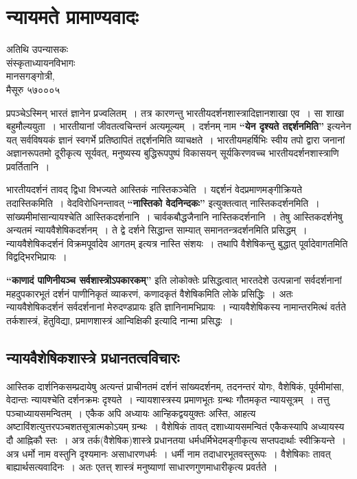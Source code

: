 {\fontsize{15}{17}\selectfont
\chapter{न्यायमते प्रामाण्यवादः}

\begin{center}
\smallskip
अतिथि उपन्यासकः\\
संस्कृताध्यायनविभागः\\
मानसगङ्गोत्री,\\ 
मैसूरु ५७०००५
\addrule
\end{center}
प्रपञ्चेऽस्मिन् भारतं ज्ञानेन प्रज्वलितम्~। तत्र कारणन्तु भारतीयदर्शनशास्त्रादिज्ञानशाखा एव~। सा शाखा बहुमौल्ययुता~। भारतीयानां जीवतत्वचिन्तनं अत्यमूल्यम्~। दर्शनम् नाम \textbf{“येन दृश्यते तद्दर्शनमिति”} इत्यनेन यत् सर्वविषयकं ज्ञानं स्वगर्भे प्रतिष्ठापितं तद्दर्शनमिति व्याचक्षते~। भारतीयमहर्षिभिः स्वीय तपो द्वारा जनानां अज्ञानरूपतमो दूरीकृत्य सूर्यवत्, मनुष्यस्य बुद्धिरूपपुष्पं विकासयन् सूर्यकिरणवच्च भारतीयदर्शनशास्त्राणि प्रवर्तितानि~। 

भारतीयदर्शनं तावद् द्विधा विभज्यते आस्तिकं नास्तिकञ्चेति~। यद्दर्शनं वेदप्रमाणमङ्गीक्रियते तदास्तिकमिति~। वेदविरोधिनन्तावत् \textbf{“नास्तिको वेदनिन्दकः”} इत्युक्तत्वात् नास्तिकदर्शनमिति~। सांख्यमीमांसान्यायश्चेति आस्तिकदर्शनानि~। चार्वकबौद्धजैनानि नास्तिकदर्शनानि~। तेषु आस्तिकदर्शनेषु अन्यतमं न्यायवैशेषिकदर्शनम्~। ते द्वे दर्शने सिद्धान्त साम्यात् समानतन्त्रदर्शनमिति प्रसिद्धम्~। न्यायवैशेषिकदर्शनं विक्रमपूर्वादेव आगतम् इत्यत्र नास्ति संशयः~। तथापि वैशेषिकन्तु बुद्धात् पूर्वादेवागतमिति विद्वद्भिरभिप्रायः~। 

\textbf{“काणादं पाणिनीयञ्च सर्वशास्त्रॊऽपकारकम्”} इति लोकोक्तेः प्रसिद्धत्वात् भारतदेशे उत्पन्नानां सर्वदर्शनानां महदुपकारभूतं दर्शनं पाणीनिकृतं व्याकरणं, कणादकृतं वैशेषिकमिति लोके प्रसिद्धिः~। अतः न्यायवैशेषिकदर्शनं सर्वदर्शनानां मेरुदण्डप्रायः इति ज्ञानिनामभिप्रायः~। न्यायवैशेषिकस्य नामान्तरमित्थं वर्तते तर्कशास्त्रं, हॆतुविद्या, प्रमाणशास्त्रं आन्विक्षिकी इत्यादि नान्मा प्रसिद्धः~। 

\section*{न्यायवैशेषिकशास्त्रे प्रधानतत्वविचारः}

आस्तिक दार्शनिकसम्प्रदायेषु अत्यन्तं प्राचीनतमं दर्शनं सांख्यदर्शनम्, तदनन्तरं योगः, वैशेषिकं, पूर्वमीमांसा, वेदान्तः न्यायश्चेति दर्शनक्रमः दृश्यते~। न्यायशास्त्रस्य प्रमाणभूतः ग्रन्थः गौतमकृत न्यायसूत्रम्~। तत्तु पञ्चाध्यायसमन्वितम्~। एकैक अपि अध्यायः आन्हिकद्वययुक्तः अस्ति, आहत्य अष्टाविंशत्युत्तरपञ्चशतसूत्रात्मकोऽयम् ग्रन्थः~। वैशेषिकं तावत् दशाध्यायसमन्वितं एकैकस्यापि अध्यायस्य दौ आह्निकौ स्तः~। अत्र तर्क(वैशेषिक)शास्त्रे प्रधानतया धर्मधर्मिभेदमङ्गीकृत्य सप्तपदार्थाः स्वीक्रियन्ते~। अत्र धर्मो नाम वस्तुनि दृश्यमानः असाधारणधर्मः~। धर्मी नाम तदाधारभूतवस्तुरूपः~। वैशेषिकाः तावत् बाह्यार्थसत्यवादिनः~। अतः एतत्त् शास्त्रं मनुष्याणां साधारणगुणमाधारीकृत्य प्रवर्तते~। 

}
